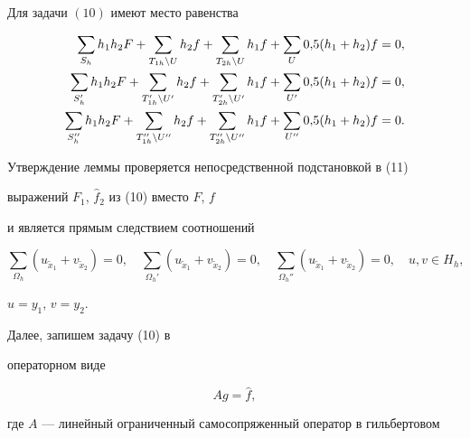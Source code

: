 \begin{lemnonum}


Для задачи $(10)$ имеют место равенства


\begin{align}


\sum_{S_h}h_1h_2F+\sum_{T_{1h}\setminus U}h_2f+


\sum_{T_{2h}\setminus U}h_1f+\sum_U0{,}5(h_1+h_2)f&=0,\notag\\


%


\sum_{S_h'}h_1h_2F+\sum_{T_{1h}'\setminus U'}h_2f+


\sum_{T_{2h}'\setminus U'}h_1f+\sum_{U'}0{,}5(h_1+h_2)f&=0,\\


%


\sum_{S_h''}h_1h_2F+\sum_{T_{1h}''\setminus U''}h_2f+


\sum_{T_{2h}''\setminus U''}h_1f+\sum_{U''}0{,}5(h_1+h_2)f&=0.\notag


\end{align}


\end{lemnonum}





Утверждение леммы проверяется непосредственной подстановкой в (11)


выражений $F_1$, $\widehat f_2$ из (10) вместо $F$, $f$ 


и является прямым следствием соотношений


$$


\sum_{\Omega_h}(u_{\tilde x_1^{~}}+v_{\tilde x_2^{~}})=0,\quad


\sum_{\Omega_h'}(u_{\tilde x_1^{~}}+v_{\tilde x_2^{~}})=0,\quad


\sum_{\Omega_h''}(u_{\tilde x_1^{~}}+v_{\tilde x_2^{~}})=0,\quad


u,v\in H_h,


$$


$u=y_1$, $v=y_2$.





Далее, запишем задачу (10) в


операторном виде


\begin{equation}


Ag=\widehat f,


\end{equation}


где $A$ --- линейный ограниченный самосопряженный оператор в гильбертовом


